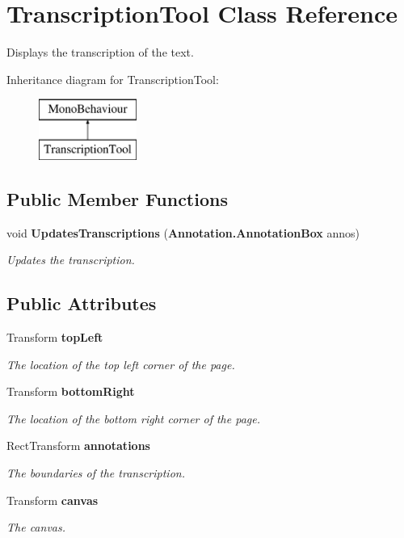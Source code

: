 \section{Transcription\+Tool Class Reference}
\label{class_transcription_tool}


Displays the transcription of the text.  


Inheritance diagram for Transcription\+Tool\+:\begin{figure}[H]
\begin{center}
\leavevmode
\includegraphics[height=2.000000cm]{class_transcription_tool}
\end{center}
\end{figure}
\subsection*{Public Member Functions}
\begin{DoxyCompactItemize}
\item 
void {\bf Updates\+Transcriptions} ({\bf Annotation.\+Annotation\+Box} annos)
\begin{DoxyCompactList}\small\item\em Updates the transcription. \end{DoxyCompactList}\end{DoxyCompactItemize}
\subsection*{Public Attributes}
\begin{DoxyCompactItemize}
\item 
Transform {\bf top\+Left}
\begin{DoxyCompactList}\small\item\em The location of the top left corner of the page. \end{DoxyCompactList}\item 
Transform {\bf bottom\+Right}
\begin{DoxyCompactList}\small\item\em The location of the bottom right corner of the page. \end{DoxyCompactList}\item 
Rect\+Transform {\bf annotations}
\begin{DoxyCompactList}\small\item\em The boundaries of the transcription. \end{DoxyCompactList}\item 
Transform {\bf canvas}
\begin{DoxyCompactList}\small\item\em The canvas. \end{DoxyCompactList}\end{DoxyCompactItemize}


